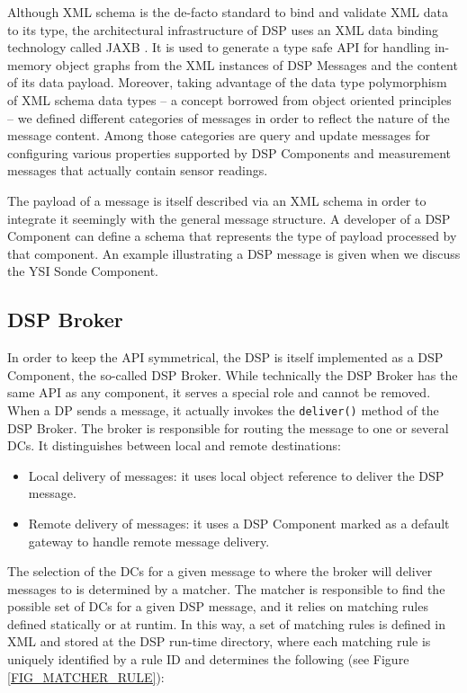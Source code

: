 \documentclass[conference]{IEEEtran}
\begin{document}
Although XML schema is the de-facto standard to bind and validate XML
data to its type, the architectural infrastructure of DSP uses an XML
data binding technology \cite{xml-dbind} called JAXB \cite{xml-jaxb}.
It is used to generate a type safe API for handling in-memory object
graphs from the XML instances of DSP Messages and the content of its
data payload. Moreover, taking advantage of the data type polymorphism
of XML schema data types -- a concept borrowed from object oriented
principles -- we defined different categories of messages in order to
reflect the nature of the message content. Among those categories are
query and update messages for configuring various properties supported
by DSP Components and measurement messages that actually contain
sensor readings.

The payload of a message is itself described via an XML schema in
order to integrate it seemingly with the general message structure. A
developer of a DSP Component can define a schema that represents the
type of payload processed by that component. An example illustrating a
DSP message is given when we discuss the YSI Sonde Component.

\subsection{DSP Broker}

In order to keep the API symmetrical, the DSP is itself implemented as
a DSP Component, the so-called DSP Broker. While technically the DSP
Broker has the same API as any component, it serves a special role and
cannot be removed. When a DP sends a message, it actually
invokes the \texttt{deliver()} method of the DSP Broker. The broker is
responsible for routing the message to one or several DCs. It
distinguishes between local and remote destinations:

\begin{itemize}
\item Local delivery of messages: it uses local object reference to
  deliver the DSP message.
\item Remote delivery of messages: it uses a DSP Component marked as a
  default gateway to handle remote message delivery.
\end{itemize}

The selection of the DCs for a given message to where the broker will
deliver messages to is determined by a matcher.  The matcher is
responsible to find the possible set of DCs for a given DSP message,
and it relies on matching rules defined statically or at runtim. In
this way, a set of matching rules is defined in XML and stored at the
DSP run-time directory, where each matching rule is uniquely
identified by a rule ID and determines the following (see Figure
\ref{FIG_MATCHER_RULE}):
\end{document}
